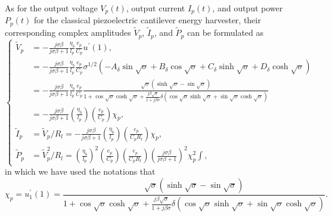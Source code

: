\documentclass{article}
\begin{document}
As for the output voltage $V_p(t)$, output current $I_p(t)$, and output power $P_p(t)$ for the classical piezoelectric cantilever energy harvester, their corresponding complex amplitudes $\tilde{V}_p$, $\tilde{I}_p$, and $\tilde{P}_p$ can be formulated as
\begin{equation}
    \left\{\begin{aligned}
        \tilde{V}_p &= -\frac{j \sigma \beta}{j \sigma \beta + 1} \frac{\eta_b}{l_p} \frac{e_p}{C_p} u^\prime(1), \\
        &= -\frac{j \sigma \beta}{j \sigma \beta + 1} \frac{\eta_b}{l_p} \frac{e_p}{C_p} \sigma^{1/2} \left( - A_\delta \sin{\sqrt{\sigma}} + B_\delta \cos{\sqrt{\sigma}} + C_\delta \sinh{\sqrt{\sigma}} + D_\delta \cosh{\sqrt{\sigma}} \right) \\
        &= - \frac{j \sigma \beta}{j \sigma \beta + 1} \frac{\eta_b}{l_p} \frac{e_p}{C_p}  \frac{ \sqrt{\sigma} \left( \sinh\sqrt{\sigma} - \sin\sqrt{\sigma} \right) }{ 1 + \cos\sqrt{\sigma } \cosh\sqrt{\sigma } + \frac{j \beta \sqrt{\sigma}}{ 1+ j \beta \sigma } \delta \left( \cos\sqrt{\sigma } \sinh\sqrt{\sigma } + \sin\sqrt{\sigma } \cosh\sqrt{\sigma } \right) }\\
        &= - \frac{j \sigma \beta}{j \sigma \beta + 1} \left(\frac{\eta_b}{l_p}\right) \left(\frac{e_p}{C_p}\right) \chi_p , \\
        \tilde{I}_p &=  \tilde{V}_p / R_l = - \frac{ j \sigma \beta } {j \sigma \beta + 1} \left( \frac{\eta_b}{l_p} \right) \left( \frac{e_p}{C_p R_l} \right) \chi_p , \\
        \tilde{P}_p &=  \tilde{V}_p^2 / R_l = \left(\frac{\eta_b}{l_p}\right)^2 \left(\frac{e_p}{C_p}\right) \left( \frac{e_p}{C_p R_l} \right) \left( \frac{ j \sigma \beta}{ j \sigma \beta + 1 } \right)^2 \chi_p^2∫,
    \end{aligned}\right.
    \label{eq:eq_peh_perfs_compact_form}
\end{equation}
in which we have used the notations that 
\begin{equation}
    \chi_p = u_1^\prime(1) = \frac{ \sqrt{\sigma} \left( \sinh\sqrt{\sigma} - \sin\sqrt{\sigma} \right) }{ 1 + \cos\sqrt{\sigma } \cosh\sqrt{\sigma } + \frac{j \beta \sqrt{\sigma}}{ 1+ j \beta \sigma } \delta \left( \cos\sqrt{\sigma } \sinh\sqrt{\sigma } + \sin\sqrt{\sigma } \cosh\sqrt{\sigma } \right) }.
    \label{eq:eq_peh_perfs_compact_form_end_ders}
\end{equation}
\end{document}
